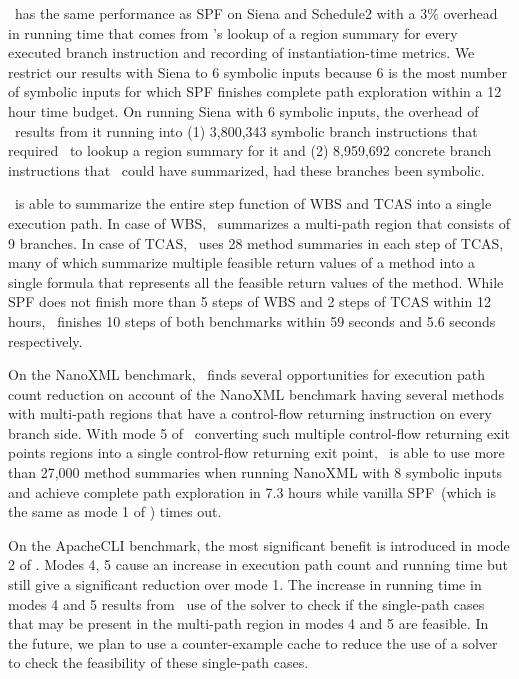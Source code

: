 \tool\ has the same performance as SPF on Siena and Schedule2 with a 3\% overhead in running time that comes from
\tool\rq s lookup of a region summary for every executed branch instruction and recording of instantiation-time metrics.
%
We restrict our results with Siena to 6 symbolic inputs because 6 is the most number of symbolic inputs for which
SPF finishes complete path exploration within a 12 hour time budget.
%
On running Siena with 6 symbolic inputs, the overhead of \tool\ results from it running into (1) 3,800,343 symbolic branch
instructions that required \tool\ to lookup a region summary for it and (2) 8,959,692 concrete branch instructions that
\tool\ could have summarized, had these branches been symbolic.

\tool\ is able to summarize the entire step function of WBS and TCAS into a single execution path.
%
In case of WBS, \tool\ summarizes a multi-path region that consists of 9 branches.
%
In case of TCAS, \tool\ uses 28 method summaries in each step of TCAS, many of which summarize multiple feasible return values of a method
into a single formula that represents all the feasible return values of the method.
%
While SPF does not finish more than 5 steps of WBS and 2 steps of TCAS within 12 hours, \tool\ finishes 10 steps of both
benchmarks within 59 seconds and 5.6 seconds respectively.

On the NanoXML benchmark, \tool\ finds several opportunities for execution path count reduction on account of the
NanoXML benchmark having several methods with multi-path regions that have a control-flow returning instruction on every
branch side.
%
With mode 5 of \tool\ converting such multiple control-flow returning exit points regions into a single control-flow
returning exit point, \tool\ is able to use more than 27,000 method summaries when running NanoXML with 8 symbolic
inputs and achieve complete path exploration in 7.3 hours while vanilla SPF~(which is the same as mode 1 of \tool)
times out.

On the ApacheCLI benchmark, the most significant benefit is introduced in mode 2 of \tool.
%
Modes 4, 5 cause an increase in execution path count and running time but still give a significant reduction over
mode 1.
%
The increase in running time in modes 4 and 5 results from \tool\ use of the solver to check if the single-path cases
that may be present in the multi-path region in modes 4 and 5 are feasible.
%
In the future, we plan to use a counter-example cache to reduce the use of a solver to check the feasibility of these
single-path cases.

